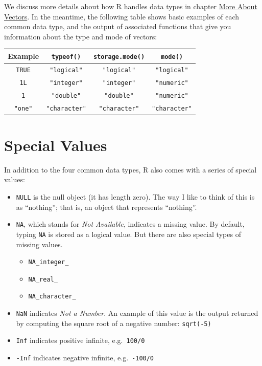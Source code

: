 \documentclass[
]{book}
\providecommand{\tightlist}{%
  \setlength{\itemsep}{0pt}\setlength{\parskip}{0pt}}
\begin{document}
We discuss more details about how R handles data types in chapter
\protect\hyperlink{vectors4}{More About Vectors}.
In the meantime, the following table shows basic examples of each common
data type, and the output of associated functions that give you information
about the type and mode of vectors:

\begin{longtable}[]{@{}cccc@{}}
\toprule()
Example & \texttt{typeof()} & \texttt{storage.mode()} & \texttt{mode()} \\
\midrule()
\endhead
\texttt{TRUE} & \texttt{"logical"} & \texttt{"logical"} & \texttt{"logical"} \\
\texttt{1L} & \texttt{"integer"} & \texttt{"integer"} & \texttt{"numeric"} \\
\texttt{1} & \texttt{"double"} & \texttt{"double"} & \texttt{"numeric"} \\
\texttt{"one"} & \texttt{"character"} & \texttt{"character"} & \texttt{"character"} \\
\bottomrule()
\end{longtable}

\hypertarget{special-values}{%
\section{Special Values}\label{special-values}}

In addition to the four common data types, R also comes with a series of
special values:

\begin{itemize}
\item
  \texttt{NULL} is the null object (it has length zero). The way I like to think of
  this is as ``nothing''; that is, an object that represents ``nothing''.
\item
  \texttt{NA}, which stands for \emph{Not Available}, indicates a missing value. By default,
  typing \texttt{NA} is stored as a logical value. But there are also special types of
  missing values.

  \begin{itemize}
  \tightlist
  \item
    \texttt{NA\_integer\_}
  \item
    \texttt{NA\_real\_}
  \item
    \texttt{NA\_character\_}
  \end{itemize}
\item
  \texttt{NaN} indicates \emph{Not a Number}. An example of this value is the output
  returned by computing the square root of a negative number: \texttt{sqrt(-5)}
\item
  \texttt{Inf} indicates positive infinite, e.g.~\texttt{100/0}
\item
  \texttt{-Inf} indicates negative infinite, e.g.~\texttt{-100/0}
\end{itemize}
\end{document}
